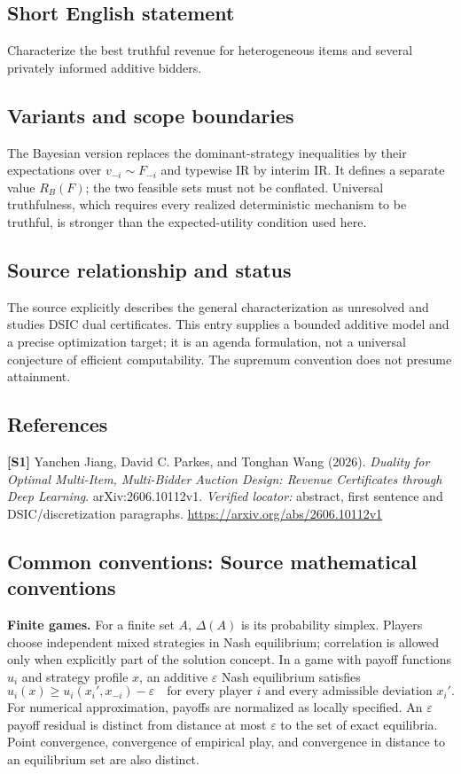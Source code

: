 \documentclass[11pt,a4paper]{article}
\begin{document}
\subsection*{Short English statement}
Characterize the best truthful revenue for heterogeneous items and several privately informed additive bidders.
\subsection*{Variants and scope boundaries}
The Bayesian version replaces the dominant-strategy inequalities by their expectations over $v_{-i}\sim F_{-i}$ and typewise IR by interim IR. It defines a separate value $R_B(F)$; the two feasible sets must not be conflated. Universal truthfulness, which requires every realized deterministic mechanism to be truthful, is stronger than the expected-utility condition used here.
\subsection*{Source relationship and status}
The source explicitly describes the general characterization as unresolved and studies DSIC dual certificates. This entry supplies a bounded additive model and a precise optimization target; it is an agenda formulation, not a universal conjecture of efficient computability. The supremum convention does not presume attainment.
\subsection*{References}
\begingroup\footnotesize\raggedright
\textbf{[S1]} Yanchen Jiang, David C. Parkes, and Tonghan Wang (2026). \emph{Duality for Optimal Multi-Item, Multi-Bidder Auction Design: Revenue Certificates through Deep Learning}. arXiv:2606.10112v1. \textit{Verified locator:} abstract, first sentence and DSIC/discretization paragraphs. \url{https://arxiv.org/abs/2606.10112v1}
\par\endgroup

\subsection*{Common conventions: Source mathematical conventions}

\textbf{Finite games.} For a finite set $A$, $\Delta(A)$ is its probability
simplex. Players choose independent mixed strategies in Nash equilibrium;
correlation is allowed only when explicitly part of the solution concept.
In a game with payoff functions $u_i$ and strategy profile $x$, an additive
$\varepsilon$ Nash equilibrium satisfies
\[
 u_i(x)\geq u_i(x_i',x_{-i})-\varepsilon
 \quad\text{for every player $i$ and every admissible deviation $x_i'$}.
\]
For numerical approximation, payoffs are normalized as locally specified.
An $\varepsilon$ payoff residual is distinct from distance at most
$\varepsilon$ to the set of exact equilibria. Point convergence, convergence
of empirical play, and convergence in distance to an equilibrium set are
also distinct.
\end{document}
